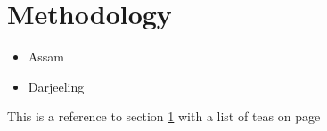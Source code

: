 \documentclass{article}
\begin{document}
\section{Methodology}
\label{section: methodology}

\begin{itemize}
\label{list: teas}
\item Assam
\item Darjeeling
\end{itemize}

This is a reference to section \ref{section: methodology} with a list of teas on page \pageref{list: teas}
\end{document}
